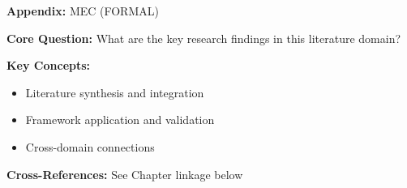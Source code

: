 
\begin{tcolorbox}[colback=blue!5!white, colframe=blue!75!black,
    title=Quick Reference: Appendix UNMAPPED_MEC]
\textbf{Appendix:} MEC (FORMAL)

\textbf{Core Question:} What are the key research findings in this literature domain?

\textbf{Key Concepts:}
\begin{itemize}[nosep]
\item Literature synthesis and integration
\item Framework application and validation
\item Cross-domain connections
\end{itemize}

\textbf{Cross-References:} See Chapter linkage below
\end{tcolorbox}


\begin{abstract}
This appendix provides a systematic review and integration of key research findings
in the FORMAL domain. It synthesizes literature relevant to the Evidence-Based
Framework (EBF) and identifies connections to the 10C CORE architecture.
\end{abstract}


